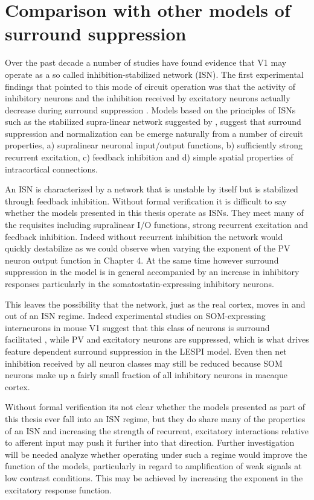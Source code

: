 \section{Comparison with other models of surround suppression}

Over the past decade a number of studies have found evidence that V1
may operate as a so called inhibition-stabilized network (ISN). The
first experimental findings that pointed to this mode of circuit
operation was that the activity of inhibitory neurons and the
inhibition received by excitatory neurons actually decrease during
surround suppression \citep{Ozeki2009b}. Models based on the
principles of ISNs such as the stabilized supra-linear network
suggested by \cite{Rubin2015}, suggest that surround suppression and
normalization can be emerge naturally from a number of circuit
properties, a) supralinear neuronal input/output functions, b)
sufficiently strong recurrent excitation, c) feedback inhibition and
d) simple spatial properties of intracortical connections.

An ISN is characterized by a network that is unstable by itself but is
stabilized through feedback inhibition. Without formal verification it
is difficult to say whether the models presented in this thesis
operate as ISNs. They meet many of the requisites including
supralinear I/O functions, strong recurrent excitation and feedback
inhibition. Indeed without recurrent inhibition the network would
quickly destabilize as we could observe when varying the exponent of
the PV neuron output function in Chapter 4. At the same time however
surround suppression in the model is in general accompanied by an
increase in inhibitory responses particularly in the
somatostatin-expressing inhibitory neurons.

This leaves the possibility that the network, just as the real cortex,
moves in and out of an ISN regime. Indeed experimental studies on
SOM-expressing interneurons in mouse V1 suggest that this class of
neurons is surround facilitated \citep{Adesnik2012}, while PV and
excitatory neurons are suppressed, which is what drives feature
dependent surround suppression in the LESPI model. Even then net
inhibition received by all neuron classes may still be reduced because
SOM neurons make up a fairly small fraction of all inhibitory neurons
in macaque cortex.

Without formal verification its not clear whether the models presented
as part of this thesis ever fall into an ISN regime, but they do share
many of the properties of an ISN and increasing the strength of
recurrent, excitatory interactions relative to afferent input may push
it further into that direction. Further investigation will be needed
analyze whether operating under such a regime would improve the
function of the models, particularly in regard to amplification of
weak signals at low contrast conditions. This may be achieved by
increasing the exponent in the excitatory response function.

